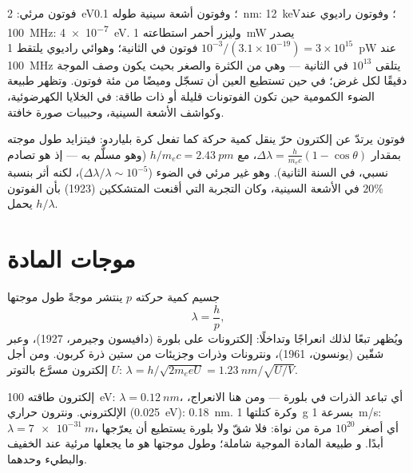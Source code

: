 \begin{example}\label{ex:b1:quantum-introduction:orders}
فوتون مرئي: \qty{2}{eV}؛ وفوتون أشعة سينية طوله \qty{0.1}{nm}: \qty{12}{keV}؛
وفوتون راديوي عند \qty{100}{MHz}: \qty{4e-7}{eV}. وليزر أحمر استطاعته \qty{1}{mW}
يصدر $10^{-3}/(3.1 \times 10^{-19}) = 3 \times 10^{15}$ فوتون في الثانية؛
وهوائي راديوي يلتقط \qty{1}{pW} عند \qty{100}{MHz} يتلقى $10^{13}$
في الثانية --- وهي من الكثرة والصغر بحيث يكون وصف الموجة دقيقًا
لكل غرض؛ في حين تستطيع العين أن تسجّل وميضًا من
مئة فوتون. وتظهر طبيعة الضوء الكمومية حين تكون الفوتونات
قليلة أو ذات طاقة: في الخلايا الكهرضوئية، وكواشف الأشعة السينية، وحبيبات
صورة خافتة.
\end{example}

\begin{remark}\label{rem:b1:quantum-introduction:compton}
فوتون يرتدّ عن إلكترون حرّ ينقل كمية حركة كما تفعل
كرة بلياردو: فيتزايد طول موجته بمقدار $\Delta\lambda = \frac{h}{m_ec}(1 -
\cos\theta)$، مع $h/m_ec = \qty{2.43}{pm}$ (وهو مسلَّم به --- إذ هو تصادم
نسبي، في السنة الثانية). وهو غير مرئي في الضوء ($\Delta\lambda/\lambda \sim 10^{-5}$)،
لكنه أثر بنسبة $20\%$ في الأشعة السينية، وكان التجربة التي أقنعت
المتشككين (1923) بأن الفوتون يحمل  $h/\lambda$.
\end{remark}

\section{موجات المادة}

\begin{theorem}[دي بروي]\label{thm:b1:quantum-introduction:debroglie}
جسيم كمية حركته $p$ ينتشر موجةً طول موجتها
\[
\lambda = \frac{h}{p} ,
\]
ويُظهر تبعًا لذلك انعراجًا وتداخلًا: إلكترونات على
بلورة (دافيسون وجيرمر، 1927)، وعبر شقّين (يونسون، 1961)،
ونترونات وذرات وجزيئات من ستين ذرة كربون. ومن أجل إلكترون
مسرَّع بالتوتر $U$: $\lambda = h/\sqrt{2m_eeU} = \qty{1.23}{nm}/\sqrt{U/\unit{V}}$.
\end{theorem}
\admitted

\begin{example}[لماذا لم نرَها قط]\label{ex:b1:quantum-introduction:wavelengths}
إلكترون طاقته \qty{100}{eV}: $\lambda = \qty{0.12}{nm}$، أي تباعد
الذرات في بلورة --- ومن هنا الانعراج، 
الإلكتروني. ونترون حراري (\qty{0.025}{eV}): \qty{0.18}{nm}. وكرة
كتلتها \qty{1}{g} بسرعة \qty{1}{m/s}: $\lambda = \qty{7e-31}{m}$، أي أصغر $10^{20}$ مرة
من نواة: فلا شقّ ولا بلورة يستطيع أن يعرّجها أبدًا. و
طبيعة المادة الموجية شاملة؛ وطول موجتها هو ما يجعلها
مرئية عند الخفيف والبطيء وحدهما.
\end{example}

